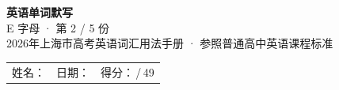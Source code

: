 \documentclass[10pt,a4paper]{article}
\begin{document}
\pagestyle{plain}

\begin{center}
{\LARGE\bfseries 英语单词默写}\\[0.22em]
{\large E 字母 · 第 2 / 5 份}\\[0.18em]
{\small 2026年上海市高考英语词汇用法手册 · 参照普通高中英语课程标准}
\end{center}

\vspace{0.25em}
\noindent\begin{tabular}{@{}p{}@{}p{}@{}p{}@{}}
姓名：\underline{\hspace{2.0cm}} & 日期：\underline{\hspace{2.0cm}} & 得分：\underline{\hspace{1.3cm}}\,/\,49 \\
\end{tabular}

\vspace{0.3em}

\vspace{0.08em}
\end{document}
